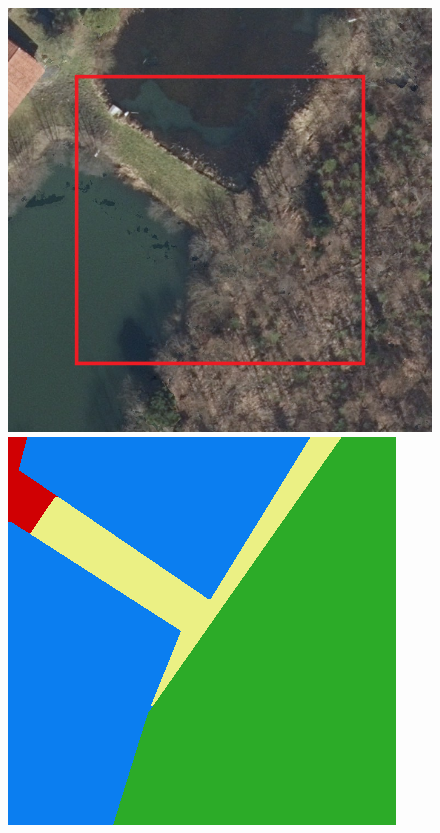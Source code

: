\begin{figure}
    \vspace{3mm}
    \includegraphics[width=\UnetPredictionsImageWidth]{images/unet/138625-image} \hfill
    \includegraphics[width=\UnetPredictionsImageWidth]{images/unet/138625-label} \hfill

\end{figure}
